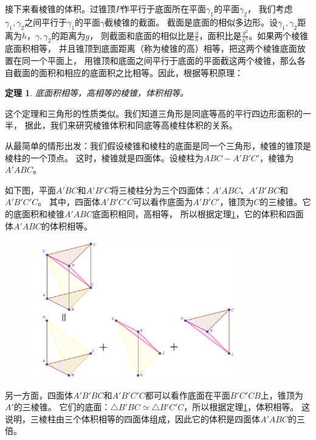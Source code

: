 \documentclass[12pt,UTF8]{ctexbook}
\newtheorem{tm}{定理}[section]
\begin{document}
接下来看棱锥的体积。过锥顶$P$作平行于底面所在平面$\gamma_1$的平面$\gamma_2$，
我们考虑$\gamma_1,\gamma_2$之间平行于$\gamma_1$的平面$\gamma$截棱锥的截面。
截面是底面的相似多边形。设$\gamma_1,\gamma_2$距离为$h$，$\gamma,\gamma_2$的距离为$g$，
则截面和底面的相似比是$\frac{g}{h}$，面积比是$\frac{g^2}{h^2}$。如果两个棱锥底面积相等，
并且锥顶到底面距离（称为棱锥的高）相等，把这两个棱锥底面放置在同一个平面上，
用锥顶和底面之间平行于底面的平面截这两个棱锥，那么各自截面的面积和相应的底面积之比相等。因此，根据等积原理：
\begin{tm}\label{tm:3-2-10}
    底面积相等，高相等的棱锥，体积相等。
\end{tm}
这个定理和三角形的性质类似。我们知道三角形是同底等高的平行四边形面积的一半，
据此，我们来研究棱锥体积和同底等高棱柱体积的关系。

从最简单的情形出发：我们假设棱锥和棱柱的底面是同一个三角形，棱锥的锥顶是棱柱的一个顶点。
这时，棱锥就是四面体。设棱柱为$ABC-A'B'C'$，棱锥为$A'ABC$。

如下图，平面$A'BC$和$A'B'C$将三棱柱分为三个四面体：$A'ABC$、$A'B'BC$和$A'B'C'C$。
其中，四面体$A'B'C'C$可以看作底面为$A'B'C'$，锥顶为$C$的三棱锥。它的底面积和棱锥$A'ABC$底面积相同，高相等，
所以根据定理\ref{tm:3-2-10}，它的体积和四面体$A'ABC$的体积相等。

\begin{figure}[h]
    \vspace{4pt}
    \centering
    \includegraphics[width=0.8\textwidth]{tu/三棱柱体积1.png}
    \captionsetup{justification=centering}
\end{figure}

另一方面，四面体$A'B'BC$和$A'B'C'C$都可以看作底面在平面$B'C'CB$上，锥顶为$A'$的三棱锥。
它们的底面：$\triangle B'BC \simeq \triangle B'C'C$，所以根据定理\ref{tm:3-2-10}，体积相等。
这说明，三棱柱由三个体积相等的四面体组成，因此它的体积是四面体$A'ABC$的三倍。
\end{document}
